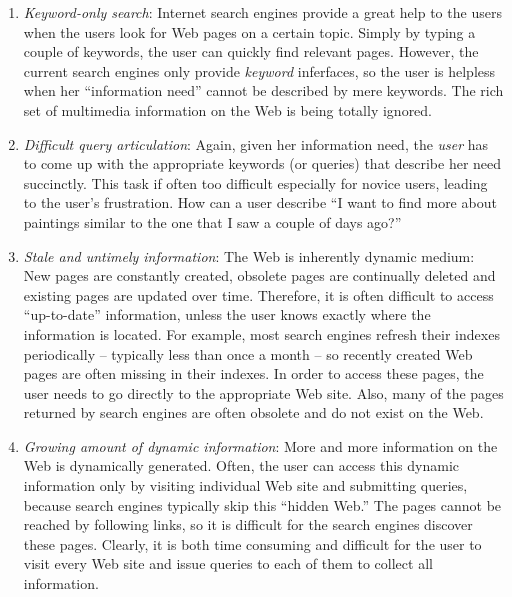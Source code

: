\begin{enumerate}

\item {\em Keyword-only search}:
  Internet search engines provide a great help
  to the users when the users look for Web pages on a certain topic.
  Simply by typing a couple of keywords, the user can quickly
  find relevant pages. However, the current search engines
  only provide {\em keyword} inferfaces, so the user is helpless
  when her ``information need'' cannot be described 
  by mere keywords. The rich set of multimedia information 
  on the Web is being totally ignored.

\item {\em Difficult query articulation}:
  Again, given her information need, the {\em user} has to
  come up with the appropriate keywords (or queries) that 
  describe her need succinctly. This task if often too difficult
  especially for novice users, leading to the user's frustration.
  How can a user describe ``I want to find more about paintings
  similar to the one that I saw a couple of days ago?''

\item {\em Stale and untimely information}:
  The Web is inherently dynamic medium: New pages
  are constantly created, obsolete pages are continually deleted
  and existing pages are updated over time.
  Therefore, it is often difficult to access ``up-to-date'' information,
  unless the user knows exactly where the information is located.
  For example, most search engines refresh their
  indexes periodically -- typically less than once a month --
  so recently created Web pages are often missing in their indexes. 
  In order to access these pages,
  the user needs to go directly to the appropriate Web site.
  Also, many of the pages returned by search engines
  are often obsolete and do not exist on the Web.

\item {\em Growing amount of dynamic information}:
  More and more information on the Web is dynamically generated.
  Often, the user can access this dynamic information
  only by visiting individual Web site and submitting queries,
  because search engines typically skip this ``hidden Web.''
  The pages cannot be reached by following links,
  so it is difficult for the search engines discover
  these pages. Clearly, it is both time consuming and difficult
  for the user to visit every Web site and issue
  queries to each of them to collect all information.
  
\end{enumerate}


